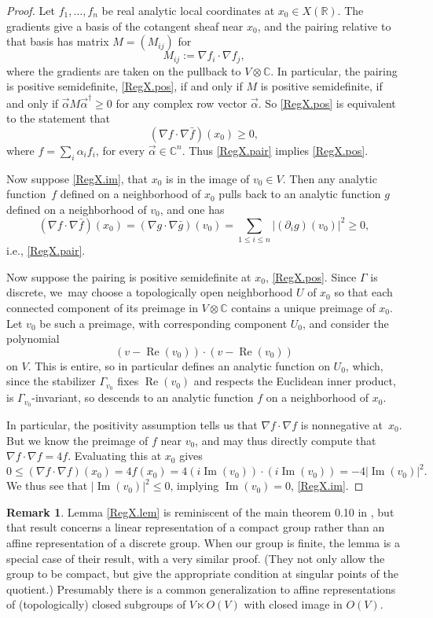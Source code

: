 \documentclass[JEP,XML,SOM,Unicode,NoFloatCountersInSection,published]{cedram}
\theoremstyle{definition}
\newtheorem*{rmk*}{Remark}
\newcommand{\R}{\mathbb{R}}
\newcommand{\C}{\mathbb{C}}
\DeclareMathOperator{\RE}{Re}
\DeclareMathOperator{\IM}{Im}
\begin{document}
\begin{proof}
Let $f_1,\dots,f_n$ be real analytic local coordinates at $x_0\in
X(\R)$. The gradients give a basis of the cotangent sheaf near $x_0$,
and the pairing relative to that basis has matrix $M = (M_{ij})$ for
\[
M_{ij} := \nabla f_i\cdot \nabla f_j,
\]
where the gradients are taken on the pullback to $V\otimes \C$. In
particular, the pairing is positive semidefinite, \eqref{RegX.pos}, if and only if $M$ is positive
semidefinite, if and only if $\vec\alpha M\vec\alpha^\dagger\ge 0$ for any complex
row vector $\vec\alpha$. So \eqref{RegX.pos} is equivalent to the statement that
\[
(\nabla f\cdot \nabla \bar{f})(x_0)\ge 0,
\]
where $f=\sum_i \alpha_i f_i$, for every $\vec\alpha \in \C^n$. Thus \eqref{RegX.pair} implies \eqref{RegX.pos}.

Now suppose \eqref{RegX.im}, that $x_0$ is in the image of $v_0\in V$. Then any analytic
function~$f$ defined on a neighborhood of $x_0$ pulls back to an
analytic function $g$ defined on a neighborhood of $v_0$, and one has
\[
(\nabla f\cdot \nabla \bar{f})(x_0)
=
(\nabla g\cdot \nabla \bar{g})(v_0)
=
\sum_{1\le i\le n} |(\partial_i g)(v_0)|^2
\ge 0,
\]
i.e., \eqref{RegX.pair}.

Now suppose the pairing is positive
semidefinite at $x_0$, \eqref{RegX.pos}. Since $\Gamma$ is discrete, we~may choose a
topologically open neighborhood $U$ of $x_0$ so that each connected
component of its preimage in $V\otimes \C$ contains a unique preimage of
$x_0$. Let $v_0$ be such a preimage, with corresponding component
$U_0$, and consider the polynomial
\[
(v-\RE(v_0))\cdot (v - \RE(v_0))
\]
on $V$. This is entire, so in particular defines an analytic
function on $U_0$, which, since the stabilizer $\Gamma_{v_0}$ fixes
$\RE(v_0)$ and respects the Euclidean inner product, is
$\Gamma_{v_0}$-invariant, so descends to an analytic function $f$ on a
neighborhood of $x_0$.

In particular, the positivity assumption tells us that $\nabla f\cdot
\nabla f$ is nonnegative at~$x_0$. But we know the preimage of $f$ near
$v_0$, and may thus directly compute that $\nabla f\cdot \nabla f=4f$.
Evaluating this at $x_0$ gives
\[
0\le (\nabla f\cdot \nabla f)(x_0) = 4f(x_0) = 4 (i\IM(v_0))\cdot
(i\IM(v_0))
= -4 \left|\IM(v_0)\right|^2.
\]
We thus see that $\left|\IM(v_0)\right|^2\le 0$, implying $\IM(v_0)=0$, \eqref{RegX.im}.
\end{proof}

\begin{rmk*}
Lemma \ref{RegX.lem} is reminiscent of the main theorem 0.10 in
\cite{ProcesiSchwarz}, but that result concerns a linear representation of a
compact group rather than an affine representation of a discrete group.
When our group is finite, the lemma is a special case of their result, with a
very similar proof. (They not only allow the group to be compact, but
give the appropriate condition at singular points of the quotient.)
Presumably there is a common generalization to affine representations of
(topologically) closed subgroups of $V\ltimes O(V)$ with closed image in
$O(V)$.
\end{rmk*}
\end{document}
